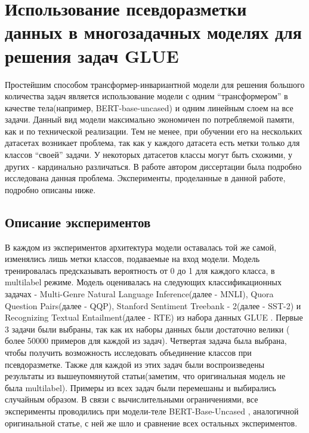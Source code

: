 \chapter{Использование псевдоразметки данных в многозадачных моделях для решения задач GLUE}\label{ch:pseudolabel}

Простейшим способом трансформер-инвариантной модели для решения большого количества задач является использование модели с одним “трансформером” в качестве тела(например, BERT-base-uncased) и одним линейным слоем на все задачи. Данный вид модели максимально экономичен по потребляемой памяти, как и по технической реализации. Тем не менее, при обучении его на нескольких датасетах возникает проблема, так как у каждого датасета есть метки только для классов “своей” задачи. У некоторых датасетов классы могут быть схожими, у других - кардинально различаться. В работе \cite{pseudolabel} автором диссертации была подробно исследована данная проблема. Эксперименты, проделанные в данной работе, подробно описаны ниже.




\section{Описание экспериментов}\label{ch:pseudolabel/sect1}
В каждом из экспериментов архитектура модели оставалась той же самой, изменялись лишь метки классов, подаваемые на вход модели. Модель тренировалась предсказывать вероятность от 0 до 1 для каждого класса, в multilabel режиме.
Модель оценивалась на следующих классификационных задачах - Multi-Genre Natural Language Inference(далее - MNLI), Quora Question Pairs(далее - QQP), Stanford Sentiment Treebank - 2(далее - SST-2) и Recognizing Textual Entailment(далее - RTE) из набора данных GLUE \cite{wang_2018}. Первые 3 задачи были выбраны, так как их наборы данных были достаточно велики ( более 50000 примеров для каждой из задач). Четвертая задача была выбрана, чтобы получить возможность исследовать объединение классов при псевдоразметке. Также для каждой из этих задач были воспроизведены результаты из вышеупомянутой статьи(заметим, что оригинальная модель не была multilabel). Примеры из всех задач были перемешаны и выбирались случайным образом. В связи с вычислительными ограничениями, все эксперименты проводились при модели-теле BERT-Base-Uncased \cite{devlin_2018}, аналогичной оригинальной статье, с ней же шло и сравнение всех остальных экспериментов.

